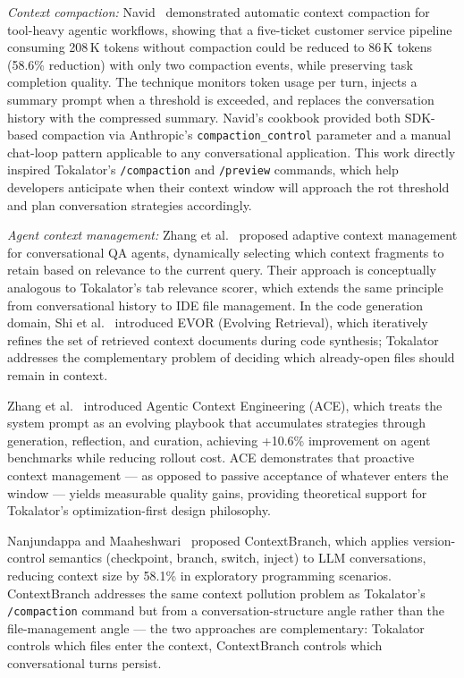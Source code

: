 \documentclass[a4paper,fleqn]{cas-dc}
\begin{document}
\textit{Context compaction:}
Navid~\cite{navid2025compaction} demonstrated automatic context compaction for tool-heavy agentic workflows, showing that a five-ticket customer service pipeline consuming 208\,K tokens without compaction could be reduced to 86\,K tokens (58.6\% reduction) with only two compaction events, while preserving task completion quality. The technique monitors token usage per turn, injects a summary prompt when a threshold is exceeded, and replaces the conversation history with the compressed summary. Navid's cookbook provided both SDK-based compaction via Anthropic's \texttt{compaction\_control} parameter and a manual chat-loop pattern applicable to any conversational application. This work directly inspired Tokalator's \texttt{/compaction} and \texttt{/preview} commands, which help developers anticipate when their context window will approach the rot threshold and plan conversation strategies accordingly.

\textit{Agent context management:}
Zhang et al.~\cite{zhang2025adaptive} proposed adaptive context management for conversational QA agents, dynamically selecting which context fragments to retain based on relevance to the current query. Their approach is conceptually analogous to Tokalator's tab relevance scorer, which extends the same principle from conversational history to IDE file management. In the code generation domain, Shi et al.~\cite{shi2024evor} introduced EVOR (Evolving Retrieval), which iteratively refines the set of retrieved context documents during code synthesis; Tokalator addresses the complementary problem of deciding which already-open files should remain in context.

Zhang et al.~\cite{zhang2025ace} introduced Agentic Context Engineering (ACE), which treats the system prompt as an evolving playbook that accumulates strategies through generation, reflection, and curation, achieving +10.6\% improvement on agent benchmarks while reducing rollout cost. ACE demonstrates that proactive context management — as opposed to passive acceptance of whatever enters the window — yields measurable quality gains, providing theoretical support for Tokalator's optimization-first design philosophy.

Nanjundappa and Maaheshwari~\cite{nanjundappa2025branch} proposed ContextBranch, which applies version-control semantics (checkpoint, branch, switch, inject) to LLM conversations, reducing context size by 58.1\% in exploratory programming scenarios. ContextBranch addresses the same context pollution problem as Tokalator's \texttt{/compaction} command but from a conversation-structure angle rather than the file-management angle — the two approaches are complementary: Tokalator controls which files enter the context, ContextBranch controls which conversational turns persist.
\end{document}

